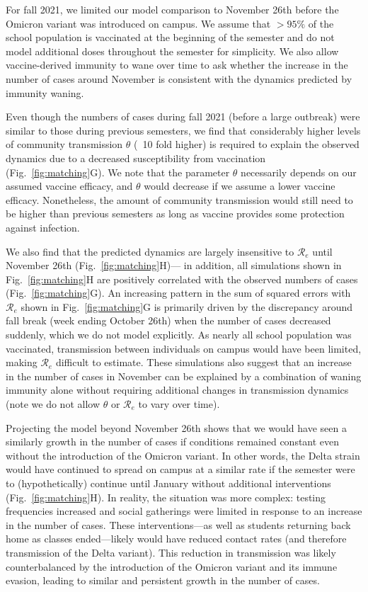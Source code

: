 \documentclass[12pt]{article}
\newcommand{\fref}[1]{Fig.~\ref{fig:#1}}
\begin{document}
For fall 2021, we limited our model comparison to November 26th before the Omicron variant was introduced on campus.
We assume that $>95\%$ of the school population is vaccinated at the beginning of the semester and do not model additional doses throughout the semester for simplicity.
We also allow vaccine-derived immunity to wane over time to ask whether the increase in the number of cases around November is consistent with the dynamics predicted by immunity waning.

Even though the numbers of cases during fall 2021 (before a large outbreak) were similar to those during previous semesters, we find that considerably higher levels of community transmission $\theta$ (~10 fold higher) is required to explain the observed dynamics due to a decreased susceptibility from vaccination (\fref{matching}G).
We note that the parameter $\theta$ necessarily depends on our assumed vaccine efficacy, and $\theta$ would decrease if we assume a lower vaccine efficacy.
Nonetheless, the amount of community transmission would still need to be higher than previous semesters as long as vaccine provides some protection against infection.

We also find that the predicted dynamics are largely insensitive to $\mathcal R_e$ until November 26th (\fref{matching}H)---
in addition, all simulations shown in \fref{matching}H are positively correlated with the observed numbers of cases (\fref{matching}G). 
An increasing pattern in the sum of squared errors with $\mathcal R_e$ shown in \fref{matching}G is primarily driven by the discrepancy around fall break (week ending October 26th) when the number of cases decreased suddenly, which we do not model explicitly.
As nearly all school population was vaccinated, transmission between individuals on campus would have been limited, making $\mathcal R_e$ difficult to estimate.
These simulations also suggest that an increase in the number of cases in November can be explained by a combination of waning immunity alone without requiring additional changes in transmission dynamics (note we do not allow $\theta$ or $\mathcal R_e$ to vary over time).

Projecting the model beyond November 26th shows that we would have seen a similarly growth in the number of cases if conditions remained constant even without the introduction of the Omicron variant.
In other words, the Delta strain would have continued to spread on campus at a similar rate if the semester were to (hypothetically) continue until January without additional interventions (\fref{matching}H).
In reality, the situation was more complex:  testing frequencies increased and social gatherings were limited in response to an increase in the number of cases.
These interventions---as well as students returning back home as classes ended---likely would have reduced contact rates (and therefore transmission of the Delta variant).
This reduction in transmission was likely counterbalanced by the introduction of the Omicron variant and its immune evasion, leading to similar and persistent growth in the number of cases.
\end{document}
